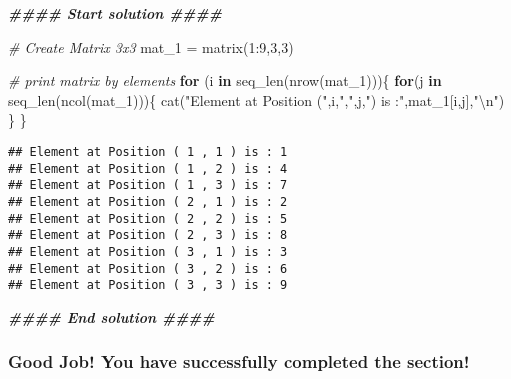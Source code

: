 \documentclass[
]{article}
\newenvironment{Shaded}{\begin{snugshade}}{\end{snugshade}}
\newcommand{\CommentTok}[1]{\textcolor[rgb]{0.56,0.35,0.01}{\textit{#1}}}
\newcommand{\ControlFlowTok}[1]{\textcolor[rgb]{0.13,0.29,0.53}{\textbf{#1}}}
\newcommand{\DecValTok}[1]{\textcolor[rgb]{0.00,0.00,0.81}{#1}}
\newcommand{\DocumentationTok}[1]{\textcolor[rgb]{0.56,0.35,0.01}{\textbf{\textit{#1}}}}
\newcommand{\FunctionTok}[1]{\textcolor[rgb]{0.00,0.00,0.00}{#1}}
\newcommand{\NormalTok}[1]{#1}
\newcommand{\OtherTok}[1]{\textcolor[rgb]{0.56,0.35,0.01}{#1}}
\newcommand{\SpecialCharTok}[1]{\textcolor[rgb]{0.00,0.00,0.00}{#1}}
\newcommand{\StringTok}[1]{\textcolor[rgb]{0.31,0.60,0.02}{#1}}
\begin{document}
\begin{Shaded}
\begin{Highlighting}[]
\DocumentationTok{\#\#\#\# Start solution \#\#\#\#}
\end{Highlighting}
\end{Shaded}

\begin{Shaded}
\begin{Highlighting}[]
\CommentTok{\# Create Matrix 3x3}
\NormalTok{mat\_1 }\OtherTok{=} \FunctionTok{matrix}\NormalTok{(}\DecValTok{1}\SpecialCharTok{:}\DecValTok{9}\NormalTok{,}\DecValTok{3}\NormalTok{,}\DecValTok{3}\NormalTok{)}
\end{Highlighting}
\end{Shaded}

\begin{Shaded}
\begin{Highlighting}[]
\CommentTok{\# print matrix by elements}
\ControlFlowTok{for}\NormalTok{ (i }\ControlFlowTok{in} \FunctionTok{seq\_len}\NormalTok{(}\FunctionTok{nrow}\NormalTok{(mat\_1)))\{}
     \ControlFlowTok{for}\NormalTok{(j }\ControlFlowTok{in} \FunctionTok{seq\_len}\NormalTok{(}\FunctionTok{ncol}\NormalTok{(mat\_1)))\{}
          \FunctionTok{cat}\NormalTok{(}\StringTok{"Element at Position ("}\NormalTok{,i,}\StringTok{","}\NormalTok{,j,}\StringTok{") is :"}\NormalTok{,mat\_1[i,j],}\StringTok{"}\SpecialCharTok{\textbackslash{}n}\StringTok{"}\NormalTok{)}
\NormalTok{     \}}
\NormalTok{\}}
\end{Highlighting}
\end{Shaded}

\begin{verbatim}
## Element at Position ( 1 , 1 ) is : 1 
## Element at Position ( 1 , 2 ) is : 4 
## Element at Position ( 1 , 3 ) is : 7 
## Element at Position ( 2 , 1 ) is : 2 
## Element at Position ( 2 , 2 ) is : 5 
## Element at Position ( 2 , 3 ) is : 8 
## Element at Position ( 3 , 1 ) is : 3 
## Element at Position ( 3 , 2 ) is : 6 
## Element at Position ( 3 , 3 ) is : 9
\end{verbatim}

\begin{Shaded}
\begin{Highlighting}[]
\DocumentationTok{\#\#\#\# End solution \#\#\#\#}
\end{Highlighting}
\end{Shaded}

\hypertarget{good-job-you-have-successfully-completed-the-section-1}{%
\subsubsection{Good Job! You have successfully completed the
section!}\label{good-job-you-have-successfully-completed-the-section-1}}
\end{document}
